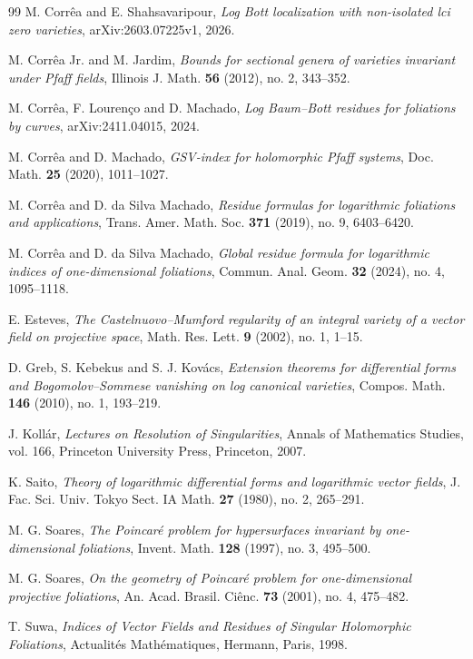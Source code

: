 \documentclass[12pt,reqno,a4paper]{amsart}
\numberwithin{equation}{section}
\theoremstyle{plain}
\theoremstyle{definition}
\begin{document}
\begin{thebibliography}{99}
M. Corr\^ea and E. Shahsavaripour,
\textit{Log Bott localization with non-isolated lci zero varieties},
arXiv:2603.07225v1, 2026.

M. Corr\^ea Jr. and M. Jardim,
\textit{Bounds for sectional genera of varieties invariant under Pfaff fields},
Illinois J. Math. \textbf{56} (2012), no. 2, 343--352.

M. Corr\^ea, F. Louren\c co and D. Machado,
\textit{Log Baum--Bott residues for foliations by curves},
arXiv:2411.04015, 2024.

M. Corr\^ea and D. Machado,
\textit{GSV-index for holomorphic Pfaff systems},
Doc. Math. \textbf{25} (2020), 1011--1027.

M. Corr\^ea and D. da Silva Machado,
\textit{Residue formulas for logarithmic foliations and applications},
Trans. Amer. Math. Soc. \textbf{371} (2019), no. 9, 6403--6420.

M. Corr\^ea and D. da Silva Machado,
\textit{Global residue formula for logarithmic indices of one-dimensional foliations},
Commun. Anal. Geom. \textbf{32} (2024), no. 4, 1095--1118.

E. Esteves,
\textit{The Castelnuovo--Mumford regularity of an integral variety of a vector field on projective space},
Math. Res. Lett. \textbf{9} (2002), no. 1, 1--15.

D. Greb, S. Kebekus and S. J. Kov\'acs,
\textit{Extension theorems for differential forms and Bogomolov--Sommese
vanishing on log canonical varieties},
Compos. Math. \textbf{146} (2010), no. 1, 193--219.

J. Koll\'ar,
\textit{Lectures on Resolution of Singularities},
Annals of Mathematics Studies, vol. 166,
Princeton University Press, Princeton, 2007.

K. Saito,
\textit{Theory of logarithmic differential forms and logarithmic vector fields},
J. Fac. Sci. Univ. Tokyo Sect. IA Math. \textbf{27} (1980), no. 2, 265--291.

M. G. Soares,
\textit{The Poincar\'e problem for hypersurfaces invariant by one-dimensional foliations},
Invent. Math. \textbf{128} (1997), no. 3, 495--500.

M. G. Soares,
\textit{On the geometry of Poincar\'e problem for one-dimensional projective foliations},
An. Acad. Brasil. Ci\^enc. \textbf{73} (2001), no. 4, 475--482.

T. Suwa,
\textit{Indices of Vector Fields and Residues of Singular Holomorphic Foliations},
Actualit\'es Math\'ematiques, Hermann, Paris, 1998.

\end{thebibliography}
\end{document}
